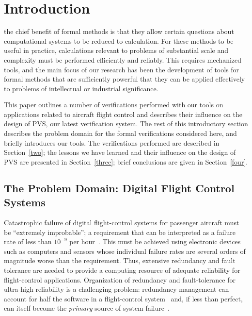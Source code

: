 \section{Introduction}
\label{one}

 the chief benefit of formal methods is that they
allow certain questions about computational systems to be reduced to
calculation.  For these methods to be useful in practice,
calculations relevant to problems of substantial scale and complexity
must be performed efficiently and reliably.  This requires mechanized
tools, and the main focus of our research has been the development of
tools for formal methods that are sufficiently powerful that they can
be applied effectively to problems of intellectual or industrial
significance.

This paper outlines a number of verifications performed with our
tools on applications related to aircraft flight control and
describes their influence on the design of PVS, our latest
verification system.  The rest of this introductory section describes
the problem domain for the formal verifications considered here, and
briefly introduces our tools.  The verifications performed are
described in Section~\ref{two}; the lessons we have learned and their
influence on the design of PVS are presented in Section~\ref{three}; brief
conclusions are given in Section~\ref{four}.

\subsection{The Problem Domain: Digital Flight Control Systems}

Catastrophic failure of digital flight-control systems for passenger
aircraft must be ``extremely improbable''; a requirement that can be
interpreted as a failure rate of less than $10^{-9}$ per
hour~\cite[paragraph 10.b]{10-9}.  This must be achieved using
electronic devices such as computers and sensors whose individual
failure rates are several orders of magnitude worse than the
requirement.  Thus, extensive redundancy and fault tolerance are
needed to provide a computing resource of adequate reliability for
flight-control applications.  Organization of redundancy and
fault-tolerance for ultra-high reliability is a challenging problem:
redundancy management can account for half the software in a
flight-control system~\cite{Dennis90:777} and, if less than perfect,
can itself become the {\em primary\/} source of system
failure~\cite{Mackall:TR}.

